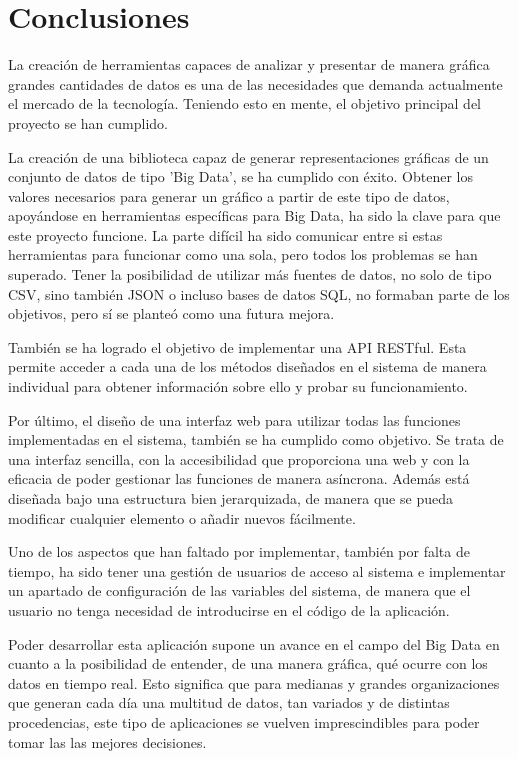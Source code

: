 \chapter{Conclusiones}

La creación de herramientas capaces de analizar y presentar de manera gráfica grandes cantidades de datos es una de las necesidades que demanda actualmente el mercado de la tecnología. Teniendo esto en mente, el objetivo principal del proyecto se han cumplido.

La creación de una biblioteca capaz de generar representaciones gráficas de un conjunto de datos de tipo 'Big Data', se ha cumplido con éxito. Obtener los valores necesarios para generar un gráfico a partir de este tipo de datos, apoyándose en herramientas específicas para Big Data, ha sido la clave para que este proyecto funcione. La parte difícil ha sido comunicar entre si estas herramientas para funcionar como una sola, pero todos los problemas se han superado. Tener la posibilidad de utilizar más fuentes de datos, no solo de tipo CSV, sino también JSON o incluso bases de datos SQL, no formaban parte de los objetivos, pero sí se planteó como una futura mejora.

También se ha logrado el objetivo de implementar una API RESTful. Esta permite acceder a cada una de los métodos diseñados en el sistema de manera individual para obtener información sobre ello y probar su funcionamiento.

Por último, el diseño de una interfaz web para utilizar todas las funciones implementadas en el sistema, también se ha cumplido como objetivo. Se trata de una interfaz sencilla, con la accesibilidad que proporciona una web y con la eficacia de poder gestionar las funciones de manera asíncrona. Además está diseñada bajo una estructura bien jerarquizada, de manera que se pueda modificar cualquier elemento o añadir nuevos fácilmente.

Uno de los aspectos que han faltado por implementar, también por falta de tiempo, ha sido tener una gestión de usuarios de acceso al sistema e implementar un apartado de configuración de las variables del sistema, de manera que el usuario no tenga necesidad de introducirse en el código de la aplicación. 

Poder desarrollar esta aplicación supone un avance en el campo del Big Data en cuanto a la posibilidad de entender, de una manera gráfica, qué ocurre con los datos en tiempo real. Esto significa que para medianas y grandes organizaciones que generan cada día una multitud de datos, tan variados y de distintas procedencias, este tipo de aplicaciones se vuelven imprescindibles para poder tomar las las mejores decisiones. 
